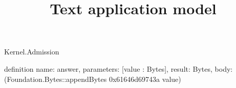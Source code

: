 \begin{lexlean}{Kernel.Admission}
\title{Text application model}
\begin{semanticmodule}
definition{
  name: answer,
  parameters: [value : Bytes],
  result: Bytes,
  body: (Foundation.Bytes::appendBytes 0x61646d69743a value)
}
\end{semanticmodule}
\end{lexlean}
